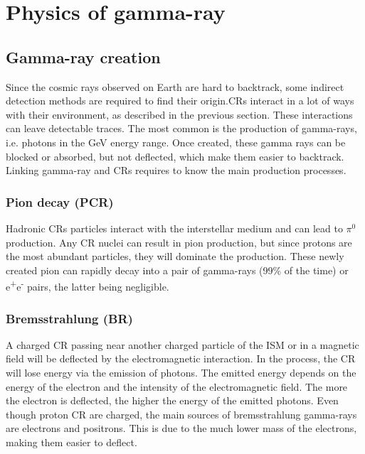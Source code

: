\section{Physics of gamma-ray}

\subsection{Gamma-ray creation}

Since the cosmic rays observed on Earth are hard to backtrack, some indirect detection methods are required to find their origin.CRs interact in a lot of ways with their environment, as described in the previous section. These interactions can leave detectable traces. The most common is the production of gamma-rays, i.e. photons in the GeV energy range. Once created, these gamma rays can be blocked or absorbed, but not deflected, which make them easier to backtrack. Linking gamma-ray and CRs requires to know the main production processes.

\subsubsection{Pion decay (PCR)}


Hadronic CRs  particles interact with the interstellar medium and can lead to $\pi^0$ production. Any CR nuclei can result in pion production, but since protons are the most abundant particles, they will dominate the production. 
These newly created pion can rapidly decay into a pair of gamma-rays (99\% of the time) or e\textsuperscript{+}e\textsuperscript{-} pairs, the latter being negligible.




\subsubsection{Bremsstrahlung (BR)}


A charged CR passing near another charged particle of the ISM or in a magnetic field will be deflected by the electromagnetic interaction. In the process, the CR will lose energy via the emission of photons. The emitted energy depends on the energy of the electron and the intensity of the electromagnetic field. The more the electron is deflected, the higher the energy of the emitted photons.
Even though proton CR are charged, the main sources of bremsstrahlung gamma-rays are electrons and positrons. This is due to the much lower mass of the electrons, making them easier to deflect.%

